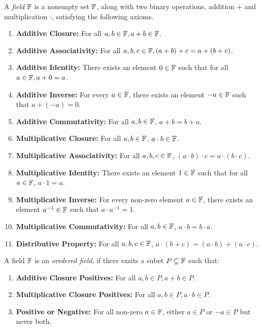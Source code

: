 \begin{definition}
  A \emph{field} $\mathbb{F}$ is a nonempty set $\mathbb{F}$, along with two binary operations, addition $+$ and multiplication $\cdot$, satisfying the following axioms.
  \begin{enumerate}
    \item \textbf{Additive Closure:} For all $a, b \in \mathbb{F}, a + b \in \mathbb{F}$.
    \item \textbf{Additive Associativity:} For all $a, b, c \in \mathbb{F}, (a + b) + c = a + (b + c)$.
    \item \textbf{Additive Identity:} There exists an element $0 \in \mathbb{F}$ such that for all $a \in \mathbb{F}, a + 0 = a$.
    \item \textbf{Additive Inverse:} For every $a \in \mathbb{F}$, there exists an element $-a \in \mathbb{F}$ such that $a + (-a) = 0$.
    \item \textbf{Additive Commutativity:} For all $a, b \in \mathbb{F}$, $a + b = b + a$.
    \item \textbf{Multiplicative Closure:} For all $a, b \in \mathbb{F}$, $a \cdot b \in \mathbb{F}$.
    \item \textbf{Multiplicative Associativity:} For all $a, b, c \in \mathbb{F}$, $(a \cdot b) \cdot c = a \cdot (b \cdot c)$.
    \item \textbf{Multiplicative Identity:} There exists an element $1 \in \mathbb{F}$ such that for all $a \in \mathbb{F}$, $a \cdot 1 = a$.
    \item \textbf{Multiplicative Inverse:} For every non-zero element $a \in \mathbb{F}$, there exists an element $a^{-1} \in \mathbb{F}$ such that $a \cdot a^{-1} = 1$.
    \item \textbf{Multiplicative Commutativity:} For all $a, b \in \mathbb{F}$, $a \cdot b = b \cdot a$.
    \item \textbf{Distributive Property:} For all $a, b, c \in \mathbb{F}$, $a \cdot (b + c) = (a \cdot b) + (a \cdot c)$.
  \end{enumerate}
\end{definition}

\begin{definition}
  A field $\mathbb{F}$ is an \emph{oredered field}, if there exsits a subet $P \subseteq \mathbb{F}$ such that:
  \begin{enumerate}
    \item \textbf{Additive Closure Positives:} For all $a, b \in P, a + b \in P$.
    \item \textbf{Multiplicative Closure Positives:} For all $a, b \in P, a \cdot b \in P$.
    \item \textbf{Positive or Negative:} For all non-zero $a \in \mathbb{F}$, either $a \in P$ or $-a \in P$ but never both.
  \end{enumerate}
\end{definition}

